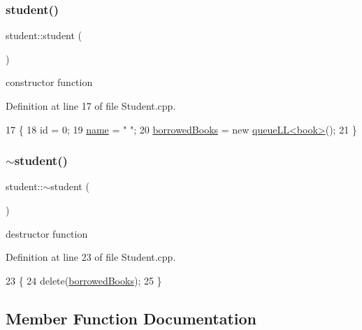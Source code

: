 \subsubsection{\texorpdfstring{student()}{student()}\hspace{0.1cm}{\footnotesize\ttfamily [2/2]}}
{\footnotesize\ttfamily student\+::student (\begin{DoxyParamCaption}{ }\end{DoxyParamCaption})}

constructor function 

Definition at line 17 of file Student.\+cpp.


\begin{DoxyCode}
17                   \{
18     \textcolor{keywordtype}{id} = 0;
19     \hyperlink{classstudent_a8bba46a454eaecf8619a68c4c38c7b8d}{name} =  \textcolor{stringliteral}{" "};
20     \hyperlink{classstudent_ab477f6c1525709586ea41364dc8c568b}{borrowedBooks} = \textcolor{keyword}{new} \hyperlink{classqueue_l_l}{queueLL<book>}();
21 \}
\end{DoxyCode}
\mbox{\label{classstudent_a102d321793438dd827305764bf59f86c}} 
\subsubsection{\texorpdfstring{$\sim$student()}{~student()}}
{\footnotesize\ttfamily student\+::$\sim$student (\begin{DoxyParamCaption}{ }\end{DoxyParamCaption})\hspace{0.3cm}{\ttfamily [virtual]}}

destructor function 

Definition at line 23 of file Student.\+cpp.


\begin{DoxyCode}
23                   \{
24     \textcolor{keyword}{delete}(\hyperlink{classstudent_ab477f6c1525709586ea41364dc8c568b}{borrowedBooks});
25 \}
\end{DoxyCode}


\subsection{Member Function Documentation}
\mbox{\label{classstudent_af02c927727b890c189a4641f01185bcc}} 

